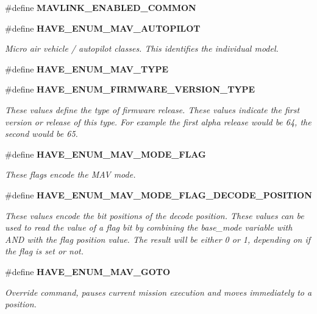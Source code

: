 \begin{DoxyCompactItemize}
\item 
\#define \textbf{ M\+A\+V\+L\+I\+N\+K\+\_\+\+E\+N\+A\+B\+L\+E\+D\+\_\+\+C\+O\+M\+M\+ON}
\item 
\#define \textbf{ H\+A\+V\+E\+\_\+\+E\+N\+U\+M\+\_\+\+M\+A\+V\+\_\+\+A\+U\+T\+O\+P\+I\+L\+OT}
\begin{DoxyCompactList}\small\item\em Micro air vehicle / autopilot classes. This identifies the individual model. \end{DoxyCompactList}\item 
\#define \textbf{ H\+A\+V\+E\+\_\+\+E\+N\+U\+M\+\_\+\+M\+A\+V\+\_\+\+T\+Y\+PE}
\item 
\#define \textbf{ H\+A\+V\+E\+\_\+\+E\+N\+U\+M\+\_\+\+F\+I\+R\+M\+W\+A\+R\+E\+\_\+\+V\+E\+R\+S\+I\+O\+N\+\_\+\+T\+Y\+PE}
\begin{DoxyCompactList}\small\item\em These values define the type of firmware release. These values indicate the first version or release of this type. For example the first alpha release would be 64, the second would be 65. \end{DoxyCompactList}\item 
\#define \textbf{ H\+A\+V\+E\+\_\+\+E\+N\+U\+M\+\_\+\+M\+A\+V\+\_\+\+M\+O\+D\+E\+\_\+\+F\+L\+AG}
\begin{DoxyCompactList}\small\item\em These flags encode the M\+AV mode. \end{DoxyCompactList}\item 
\#define \textbf{ H\+A\+V\+E\+\_\+\+E\+N\+U\+M\+\_\+\+M\+A\+V\+\_\+\+M\+O\+D\+E\+\_\+\+F\+L\+A\+G\+\_\+\+D\+E\+C\+O\+D\+E\+\_\+\+P\+O\+S\+I\+T\+I\+ON}
\begin{DoxyCompactList}\small\item\em These values encode the bit positions of the decode position. These values can be used to read the value of a flag bit by combining the base\+\_\+mode variable with A\+ND with the flag position value. The result will be either 0 or 1, depending on if the flag is set or not. \end{DoxyCompactList}\item 
\#define \textbf{ H\+A\+V\+E\+\_\+\+E\+N\+U\+M\+\_\+\+M\+A\+V\+\_\+\+G\+O\+TO}
\begin{DoxyCompactList}\small\item\em Override command, pauses current mission execution and moves immediately to a position. \end{DoxyCompactList}\item 

\end{DoxyCompactItemize}
